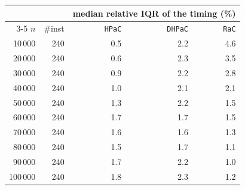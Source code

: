 \begin{tabular}{@{}rrrrr@{}}
\toprule
 &  & \multicolumn{3}{c}{median relative IQR of the timing (\%)} \\
\cmidrule(l){3-5}
$n$ & \#inst & \texttt{HPaC} & \texttt{DHPaC} & \texttt{RaC} \\
\midrule
10\,000 & 240 & 0.5 & 2.2 & 4.6 \\
20\,000 & 240 & 0.6 & 2.3 & 3.5 \\
30\,000 & 240 & 0.9 & 2.2 & 2.8 \\
40\,000 & 240 & 1.0 & 2.1 & 2.1 \\
50\,000 & 240 & 1.3 & 2.2 & 1.5 \\
60\,000 & 240 & 1.7 & 1.7 & 1.5 \\
70\,000 & 240 & 1.6 & 1.6 & 1.3 \\
80\,000 & 240 & 1.5 & 1.7 & 1.1 \\
90\,000 & 240 & 1.7 & 2.2 & 1.0 \\
100\,000 & 240 & 1.8 & 2.3 & 1.2 \\
\bottomrule
\end{tabular}
